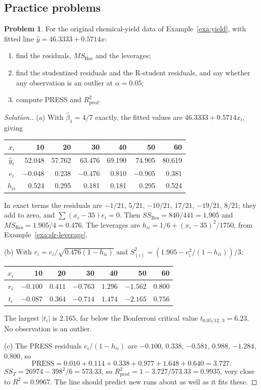 \documentclass[11pt,a4paper]{article}
\numberwithin{equation}{section}
\theoremstyle{definition}
\newtheorem{problemx}{Problem}[subsection]
\newenvironment{problem}{\begin{problemx}}{\end{problemx}}
\newenvironment{solution}
  {\renewcommand{\qedsymbol}{}\begin{proof}[\textit{Solution}.]}
  {\end{proof}}
\begin{document}
\subsection{Practice problems}
\begin{problem}\label{prob:yield-resid}
For the original chemical-yield data of Example~\ref{exa:yield}, with fitted line
$\hat y = 46.3333 + 0.5714x$:
\begin{enumerate}[label=(\alph*)]
\item find the residuals, $MS_{\mathrm{Res}}$ and the leverages;
\item find the studentized residuals and the R-student residuals, and say whether any
observation is an outlier at $\alpha = 0.05$;
\item compute PRESS and $R^2_{\mathrm{pred}}$.
\end{enumerate}
\end{problem}

\begin{solution}
(a) With $\hat\beta_1 = 4/7$ exactly, the fitted values are $46.3333 + 0.5714x_i$, giving
\begin{center}
\begin{tabular}{c|rrrrrr}
$x_i$ & 10 & 20 & 30 & 40 & 50 & 60 \\
\hline
$\hat y_i$ & 52.048 & 57.762 & 63.476 & 69.190 & 74.905 & 80.619 \\
$e_i$ & $-0.048$ & $0.238$ & $-0.476$ & $0.810$ & $-0.905$ & $0.381$ \\
$h_{ii}$ & 0.524 & 0.295 & 0.181 & 0.181 & 0.295 & 0.524 \\
\end{tabular}
\end{center}
In exact terms the residuals are $-1/21$, $5/21$, $-10/21$, $17/21$, $-19/21$, $8/21$; they
add to zero, and $\sum(x_i - 35)e_i = 0$. Then $SS_{\mathrm{Res}} = 840/441 = 1.905$ and
$MS_{\mathrm{Res}} = 1.905/4 = 0.476$. The leverages are
$h_{ii} = 1/6 + (x_i - 35)^2/1750$, from Example~\ref{exa:slr-leverage}.

(b) With $r_i = e_i/\sqrt{0.476(1 - h_{ii})}$ and $S^2_{(i)} = (1.905 - e_i^2/(1 - h_{ii}))/3$:
\begin{center}
\begin{tabular}{c|rrrrrr}
$x_i$ & 10 & 20 & 30 & 40 & 50 & 60 \\
\hline
$r_i$ & $-0.100$ & $0.411$ & $-0.763$ & $1.296$ & $-1.562$ & $0.800$ \\
$t_i$ & $-0.087$ & $0.364$ & $-0.714$ & $1.474$ & $-2.165$ & $0.756$ \\
\end{tabular}
\end{center}
The largest $|t_i|$ is $2.165$, far below the Bonferroni critical value
$t_{0.05/12,\,3} = 6.23$. No observation is an outlier.

(c) The PRESS residuals $e_i/(1 - h_{ii})$ are $-0.100$, $0.338$, $-0.581$, $0.988$,
$-1.284$, $0.800$, so
\[
\mathrm{PRESS} = 0.010 + 0.114 + 0.338 + 0.977 + 1.648 + 0.640 = 3.727 .
\]
$SS_T = 26974 - 398^2/6 = 573.33$, so $R^2_{\mathrm{pred}} = 1 - 3.727/573.33 = 0.9935$, very
close to $R^2 = 0.9967$. The line should predict new runs about as well as it fits these.
\end{solution}
\end{document}
